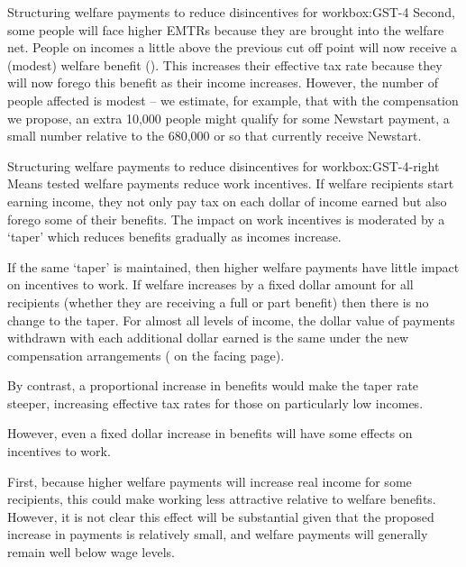 {\begin{lultrabox}{Structuring welfare payments to reduce disincentives for work}{box:GST-4}
Second, some people will face higher EMTRs because they are brought into the welfare net. People on incomes a little above the previous cut off point will now receive a (modest) welfare benefit (). This increases their effective tax rate because they will now forego this benefit as their income increases. However, the number of people affected is modest – we estimate, for example, that with the compensation we propose, an extra 10,000 people might qualify for some Newstart payment, a small number relative to the 680,000 or so that currently receive Newstart. 
\end{lultrabox}
\begin{rultrabox}{Structuring welfare payments to reduce disincentives for work}{box:GST-4-right}
Means tested welfare payments reduce work incentives. If welfare recipients start earning income, they not only pay tax on each dollar of income earned but also forego some of their benefits. The impact on work incentives is moderated by a ‘taper’ which reduces benefits gradually as incomes increase.

If the same ‘taper’ is maintained, then higher welfare payments have little impact on incentives to work. If welfare increases by a fixed dollar amount for all recipients (whether they are receiving a full or part benefit) then there is no change to the taper. For almost all levels of income, the dollar value of payments withdrawn with each additional dollar earned is the same under the new compensation arrangements ( on the facing page). 

By contrast, a proportional increase in benefits would make the taper rate steeper, increasing effective tax rates for those on particularly low incomes.

However, even a fixed dollar increase in benefits will have some effects on incentives to work.  

First, because higher welfare payments will increase real income for some recipients, this could make working less attractive relative to welfare benefits. However, it is not clear this effect will be substantial given that the proposed increase in payments is relatively small, and welfare payments will generally remain well below wage levels. 


\end{rultrabox}}
